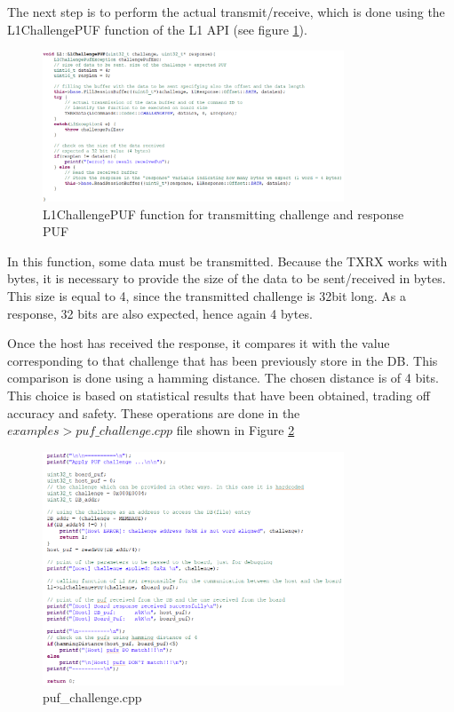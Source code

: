 The next step is to perform the actual transmit/receive, which is done using the L1ChallengePUF function of the L1 API (see figure \ref{fig:L1ChallengePUF}).

\begin{figure}[h!]
	\vspace{0.5cm}
	\includegraphics[width = 0.8\textwidth]{images/L1ChallengePUF.png}
	\caption{L1ChallengePUF function for transmitting challenge and response PUF}
	\label{fig:L1ChallengePUF}
\end{figure}


In this function, some data must be transmitted. Because the TXRX works with bytes, it is necessary to provide the size of the data to be sent/received in bytes. This size is equal to 4, since the transmitted challenge is 32bit long. As a response, 32 bits are also expected, hence again 4 bytes.

Once the host has received the response, it compares it with the value corresponding to that challenge that has been previously store in the DB. This comparison is done using a hamming distance. The chosen distance is of 4 bits. This choice is based on statistical results that have been obtained, trading off accuracy and safety. These operations are done in the $examples > puf\_challenge.cpp$ file shown in Figure \ref{fig:puf_challenge.cpp}

\begin{figure}[h!]
	\vspace{0.5cm}
	\includegraphics[width = 0.8\textwidth]{images/puf_challenge.png}
	\caption{puf\_challenge.cpp}
	\label{fig:puf_challenge.cpp}
\end{figure}

